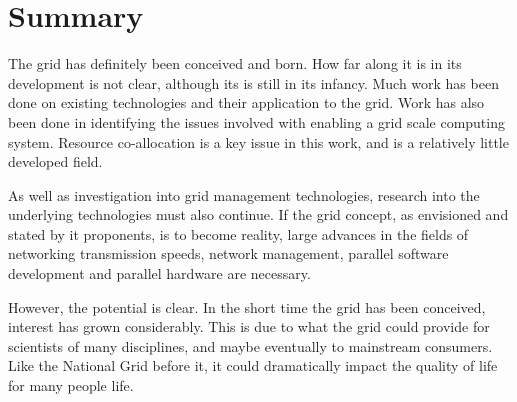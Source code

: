 \section{Summary}

The grid has definitely been conceived and born.  How far along it is in its
development is not clear, although its is still in its infancy.  Much work has
been done on existing technologies and their application to the grid.  Work has
also been done in identifying the issues involved with enabling a grid scale
computing system.  Resource co-allocation is a key issue in this work, and is a
relatively little developed field.

As well as investigation into grid management technologies, research into the
underlying technologies must also continue.  If the grid concept, as envisioned
and stated by it proponents, is to become reality, large advances in the fields
of networking transmission speeds, network management, parallel software
development and parallel hardware are necessary.

However, the potential is clear. In the short time the grid has been conceived,
interest has grown considerably.  This is due to what the grid could provide
for scientists of many disciplines, and maybe eventually to mainstream
consumers. Like the National Grid before it, it could dramatically impact the
quality of life for many people life.
